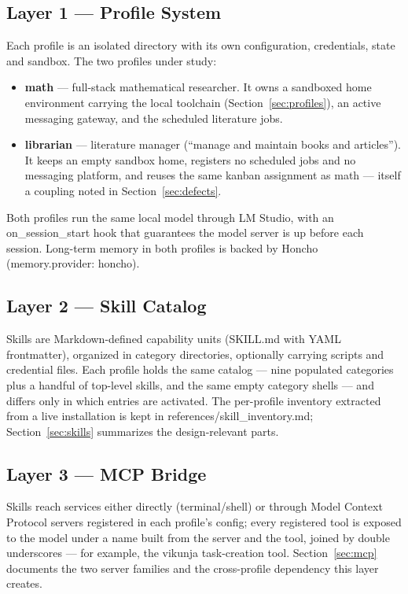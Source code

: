 \documentclass[10pt]{article}
\newcommand{\mono}[1]{{\ttfamily\small #1}}
\begin{document}
\subsection*{Layer 1 --- Profile System}
Each profile is an isolated directory with its own configuration, credentials, state and sandbox.
The two profiles under study:

\begin{itemize}
    \item \textbf{\mono{math}} --- full-stack mathematical researcher. It owns a sandboxed home
    environment carrying the local toolchain (Section~\ref{sec:profiles}), an active messaging
    gateway, and the scheduled literature jobs.
    \item \textbf{\mono{librarian}} --- literature manager (``manage and maintain books and
    articles''). It keeps an empty sandbox home, registers no scheduled jobs and no messaging
    platform, and reuses the same kanban assignment as math --- itself a coupling noted in
    Section~\ref{sec:defects}.
\end{itemize}

Both profiles run the same local model through LM Studio, with an \mono{on\_session\_start} hook
that guarantees the model server is up before each session. Long-term memory in both profiles is
backed by Honcho (\mono{memory.provider: honcho}).

\subsection*{Layer 2 --- Skill Catalog}
Skills are Markdown-defined capability units (\mono{SKILL.md} with YAML frontmatter), organized
in category directories, optionally carrying scripts and credential files. Each profile holds the
same catalog --- nine populated categories plus a handful of top-level skills, and the same empty
category shells --- and differs only in which entries are activated. The per-profile inventory
extracted from a live installation is kept in \mono{references/skill\_inventory.md};
Section~\ref{sec:skills} summarizes the design-relevant parts.

\subsection*{Layer 3 --- MCP Bridge}
Skills reach services either directly (terminal/shell) or through Model Context Protocol servers
registered in each profile's config; every registered tool is exposed to the model under a name
built from the server and the tool, joined by double underscores --- for example, the vikunja
task-creation tool. Section~\ref{sec:mcp} documents the two server families and the cross-profile
dependency this layer creates.
\end{document}
